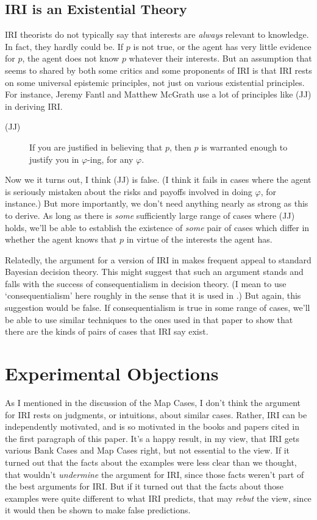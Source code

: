 \documentclass[11pt,oneside]{book}
\begin{document}
\subsection{IRI is an Existential Theory}

IRI theorists do not typically say that interests are \textit{always} relevant to knowledge. In fact, they hardly could be. If $p$ is not true, or the agent has very little evidence for $p$, the agent does not know $p$ whatever their interests. But an assumption that seems to shared by both some critics and some proponents of IRI is that IRI rests on some universal epistemic principles, not just on various existential principles. For instance, Jeremy Fantl and Matthew McGrath use a lot of principles like (JJ) in deriving IRI.

\begin{description}
\item[(JJ)] If you are justified in believing that \(p\), then \(p\) is warranted enough to justify you in \(\varphi\)-ing, for any \(\varphi\). \cite[99]{FantlMcGrath2009}
\end{description}

\noindent Now we it turns out, I think (JJ) is false. (I think it fails in cases where the agent is seriously mistaken about the risks and payoffs involved in doing $\varphi$, for instance.) But more importantly, we don't need anything nearly as strong as this to derive. As long as there is \textit{some} sufficiently large range of cases where (JJ) holds, we'll be able to establish the existence of \textit{some} pair of cases which differ in whether the agent knows that $p$ in virtue of the interests the agent has.

Relatedly, the argument for a version of IRI in \cite{Weatherson2005-WEACWD} makes frequent appeal to standard Bayesian decision theory. This might suggest that such an argument stands and falls with the success of consequentialism in decision theory. (I mean to use `consequentialism' here roughly in the sense that it is used in \cite{Hammond1988}.) But again, this suggestion would be false. If consequentialism is true in some range of cases, we'll be able to use similar techniques to the ones used in that paper to show that there are the kinds of pairs of cases that IRI say exist.

\section{Experimental Objections}
As I mentioned in the discussion of the Map Cases, I don't think the argument for IRI rests on judgments, or intuitions, about similar cases. Rather, IRI can be independently motivated, and is so motivated in the books and papers cited in the first paragraph of this paper. It's a happy result, in my view, that IRI gets various Bank Cases and Map Cases right, but not essential to the view. If it turned out that the facts about the examples were less clear than we thought, that wouldn't \textit{undermine} the argument for IRI, since those facts weren't part of the best arguments for IRI. But if it turned out that the facts about those examples were quite different to what IRI predicts, that may \textit{rebut} the view, since it would then be shown to make false predictions.
\end{document}
